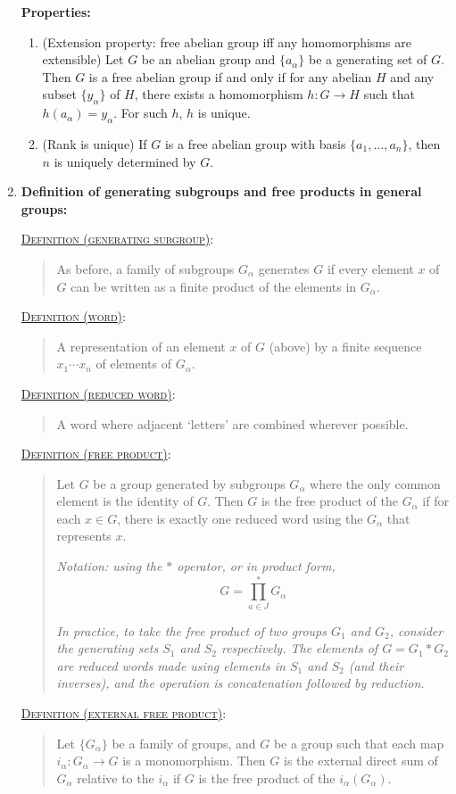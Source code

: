 \documentclass[letterpaper, 12pt]{article}
\newcommand{\defn}[2]{\textsc{\underline{Definition (#1)}:}\begin{quote} #2\end{quote}}
\begin{document}
\begin{enumerate}[resume]
            \textbf{Properties:}
                \begin{enumerate}
                \item (Extension property: free abelian group iff any homomorphisms are extensible) Let $G$ be an abelian group and $\{a_\alpha\}$ be a generating set of $G$. Then $G$ is a free abelian group if and only if for any abelian $H$ and any subset $\{y_\alpha\}$ of $H$, there exists a homomorphism $h: G\to H$ such that $h(a_\alpha) = y_\alpha$. For such $h$, $h$ is unique.
                \item (Rank is unique) If $G$ is a free abelian group with basis $\{a_1, \dots, a_n\}$, then $n$ is uniquely determined by $G$.
                \end{enumerate}
        \item \textbf{Definition of generating subgroups and free products in general groups:}

            \defn{generating subgroup}{As before, a family of subgroups $G_\alpha$ generates $G$ if every element $x$ of $G$ can be written as a finite product of the elements in $G_\alpha$.}

            \defn{word}{A representation of an element $x$ of $G$ (above) by a finite sequence $x_1\cdots x_n$ of elements of $G_\alpha$.}

            \defn{reduced word}{A word where adjacent `letters' are combined wherever possible.}

            \defn{free product}{Let $G$ be a group generated by subgroups $G_\alpha$ where the only common element is the identity of $G$. Then $G$ is the free product of the $G_\alpha$ if for each $x\in G$, there is exactly one reduced word using the $G_\alpha$ that represents $x$.

            \textit{Notation: using the $*$ operator, or in product form, \[
                G = \prod_{a\in J}^* G_\alpha
            \]}

            \textit{In practice, to take the free product of two groups $G_1$ and $G_2$, consider the generating sets $S_1$ and $S_2$ respectively. The elements of $G = G_1 * G_2$ are reduced words made using elements in $S_1$ and $S_2$ (and their inverses), and the operation is concatenation followed by reduction.}}

            \defn{external free product}{Let $\{G_\alpha\}$ be a family of groups, and $G$ be a group such that each map $i_\alpha : G_\alpha \to G$ is a monomorphism. Then $G$ is the external direct sum of $G_\alpha$ relative to the $i_\alpha$ if $G$ is the free product of the $i_\alpha(G_\alpha)$.

}
\end{enumerate}
\end{document}

